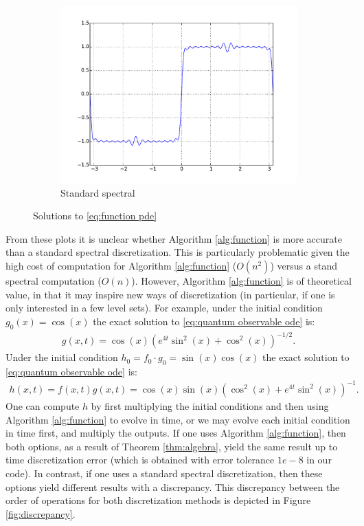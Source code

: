 \documentclass[final,leqno]{siamltex1213}
\begin{document}
\begin{figure}[h]
\begin{subfigure}{0.3\textwidth}
		\includegraphics[width=\textwidth]{./images/function_plots/Koopman_1.pdf}
		\caption{Standard spectral}
		\label{fig:standard function 1}
	\end{subfigure}
	\caption{Solutions to \eqref{eq:function pde}}
	\label{fig:function}
\end{figure}

From these plots it is unclear whether Algorithm \ref{alg:function} is more accurate than a standard spectral discretization.
This is particularly problematic given the high cost of computation for Algorithm \ref{alg:function}  ($O(n^{2})$) versus a stand spectral computation ($O(n)$).
However, Algorithm \ref{alg:function} is of theoretical value, in that it may inspire new ways of discretization (in particular, if one is only interested in a few level sets).
For example, under the initial condition $g_{0}(x) = \cos(x)$ the exact solution to \eqref{eq:quantum observable ode} is:
\begin{align*}
	g(x,t) =   \cos(x) \left( e^{4t} \sin^{2}(x) + \cos^{2}(x) \right)^{-1/2}.
\end{align*}
Under the initial condition $h_{0} = f_{0} \cdot g_{0}  = \sin(x) \cos(x)$ the exact solution to \eqref{eq:quantum observable ode} is:
\begin{align*}
	h(x,t) = f(x,t) g(x,t) = \cos(x) \sin(x) \left( \cos^{2}(x) + e^{4t} \sin^{2}(x) \right)^{-1}.
\end{align*}
One can compute $h$ by first multiplying the initial conditions and then using Algorithm \ref{alg:function} to evolve in time, or we may evolve each initial condition in time first, and multiply the outputs.
If one uses Algorithm \ref{alg:function}, then both options, as a result of Theorem \ref{thm:algebra}, yield the same result up to time discretization error (which is obtained with error tolerance $1e-8$ in our code).
In contrast, if one uses a standard spectral discretization, then these options yield different results with a discrepancy.
This discrepancy between the order of operations for both discretization methods is depicted in Figure \ref{fig:discrepancy}.
\end{document}
